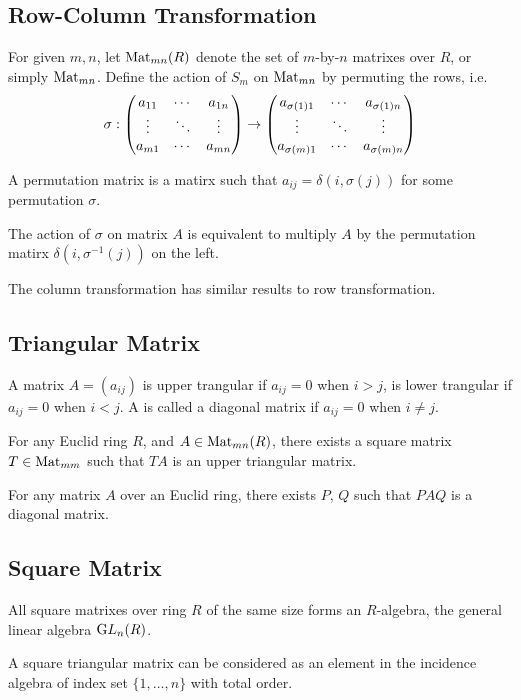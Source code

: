 \subsection{Row-Column Transformation}
For given $m, n$, let ${\mathop{\mathrm{Mat}}}_{mn}(R)$ denote the set of $m$-by-$n$ matrixes over $R$,
or simply ${\mathop{\mathrm{Mat}}}_{mn}$. Define the action of $S_m$ on ${\mathop{\mathrm{Mat}}}_{mn}$ by permuting
the rows, i.e.
\begin{equation*}
\sigma :
\left(\begin{matrix}
a_{11} & \cdots & a_{1n} \cr
\vdots & \ddots & \vdots \cr
a_{m1} & \cdots & a_{mn}
\end{matrix}\right)
\to
\left(\begin{matrix}
a_{\sigma(1) 1} & \cdots & a_{\sigma(1) n} \cr
\vdots & \ddots & \vdots \cr
a_{\sigma(m) 1} & \cdots & a_{\sigma(m) n}
\end{matrix}\right)
\end{equation*}

A permutation matrix is a matirx such that $a_{ij} = \delta(i, \sigma(j))$ for
some permutation $\sigma$.
\begin{pro}
The action of $\sigma$ on matrix $A$ is equivalent to multiply $A$ by the
permutation matirx $\delta(i, \sigma^{-1}(j))$ on the left.
\end{pro}

The column transformation has similar results to row transformation.

\subsection{Triangular Matrix}
A matrix $A = (a_{ij})$ is upper trangular if $a_{ij} = 0$ when $i > j$,
is lower trangular if $a_{ij} = 0$ when $i < j$.
A is called a diagonal matrix if $a_{ij} = 0$ when $i \neq j$.

\begin{pro}
For any Euclid ring $R$, and $A \in {\mathop{\mathrm{Mat}}}_{mn}(R)$, there exists a square matrix
$T \in {\mathop{\mathrm{Mat}}}_{mm}$ such that $TA$ is an upper triangular matrix.
\end{pro}

\begin{cly}
For any matrix $A$ over an Euclid ring, there exists $P$, $Q$ such
that $PAQ$ is a diagonal matrix.
\end{cly}

\subsection{Square Matrix}
All square matrixes over ring $R$ of the same size forms an $R$-algebra,
the general linear algebra ${\mathop{\mathrm GL}}_n(R)$.

\begin{rem}
A square triangular matrix can be considered as an element in the incidence
algebra of index set $\{1, \dots, n\}$ with total order.
\end{rem}

